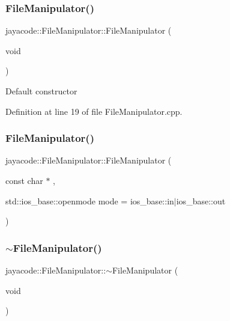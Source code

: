 \subsubsection{\texorpdfstring{File\+Manipulator()}{FileManipulator()}\hspace{0.1cm}{\footnotesize\ttfamily [1/2]}}
{\footnotesize\ttfamily jayacode\+::\+File\+Manipulator\+::\+File\+Manipulator (\begin{DoxyParamCaption}\item[{void}]{ }\end{DoxyParamCaption})}

Default constructor 

Definition at line 19 of file File\+Manipulator.\+cpp.

\mbox{\label{classjayacode_1_1_file_manipulator_ae3397a4a0fb046958476677e5083db71}} 
\subsubsection{\texorpdfstring{File\+Manipulator()}{FileManipulator()}\hspace{0.1cm}{\footnotesize\ttfamily [2/2]}}
{\footnotesize\ttfamily jayacode\+::\+File\+Manipulator\+::\+File\+Manipulator (\begin{DoxyParamCaption}\item[{const char $\ast$}]{,  }\item[{std\+::ios\+\_\+base\+::openmode}]{mode = {\ttfamily ios\+\_\+base\+:\+:in$\vert$ios\+\_\+base\+:\+:out} }\end{DoxyParamCaption})\hspace{0.3cm}{\ttfamily [explicit]}}

\mbox{\label{classjayacode_1_1_file_manipulator_aab953ecb20bf75360917c5d66a8c95b5}} 
\subsubsection{\texorpdfstring{$\sim$\+File\+Manipulator()}{~FileManipulator()}}
{\footnotesize\ttfamily jayacode\+::\+File\+Manipulator\+::$\sim$\+File\+Manipulator (\begin{DoxyParamCaption}\item[{void}]{ }\end{DoxyParamCaption})\hspace{0.3cm}{\ttfamily [virtual]}}

